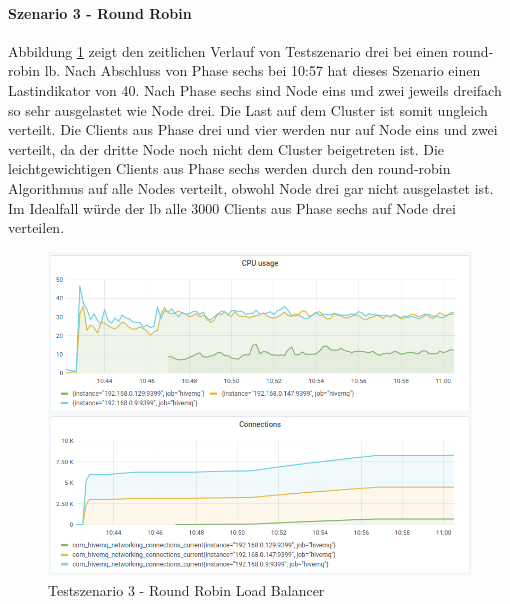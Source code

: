 \paragraph{Szenario 3 - Round Robin}
Abbildung \ref{fig:s3-rr} zeigt den zeitlichen Verlauf von Testszenario drei bei einen round-robin \ac{lb}.
Nach Abschluss von Phase sechs bei 10:57 hat dieses Szenario einen Lastindikator von 40.
Nach Phase sechs sind Node eins und zwei jeweils dreifach so sehr ausgelastet wie Node drei. Die Last auf dem Cluster ist somit ungleich verteilt.
Die Clients aus Phase drei und vier werden nur auf Node eins und zwei verteilt, da der dritte Node noch nicht dem Cluster beigetreten ist. Die leichtgewichtigen Clients aus Phase sechs werden durch den round-robin Algorithmus auf alle Nodes verteilt, obwohl Node drei gar nicht ausgelastet ist. Im Idealfall würde der \ac{lb} alle 3000 Clients aus Phase sechs auf Node drei verteilen.
\begin{figure}
    \centering
    \includegraphics[scale=0.8]{images/s3_rr.png}
    \caption{Testszenario 3 - Round Robin Load Balancer}
    \label{fig:s3-rr}
\end{figure}


